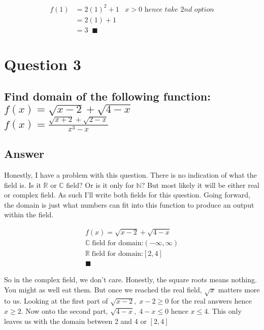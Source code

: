 \documentclass[17 pt]{extarticle}
\begin{document}
        \begin{equation*}
            \begin{split}
                f(1) &= 2(1)^2 + 1 \; \; \; \textit{$x > 0$ hence take 2nd option} \\
                &= 2(1) + 1 \\
                &= 3 \; \; \blacksquare
            \end{split}
            \end{equation*}
\section{Question 3}

\subsection*{Find domain of the following function: \newline \\ $f(x) =\sqrt{x-2} + \sqrt{4-x}$
\newline \\ $f(x) = \frac{\sqrt{x+2} + \sqrt{2-x}}{x^3-x}$}

\vspace{10mm}
\subsection*{Answer}

Honestly, I have a problem with this question. There is no indication of what the field is. Is it $\mathbb{R}$ or $\mathbb{C}$ field? Or is it only for $\mathbb{N}$? But most likely it will be either real or complex field. As 
such I'll write both fields for this question. Going forward, the domain is just what numbers can fit into this function to produce an output within the field.

\begin{equation*}
    \begin{split}
        f(x) =\sqrt{x-2} + \sqrt{4-x} \\
        \mathbb{C} \; \text{field for domain:} (- \infty, \infty) \\
        \mathbb{R} \; \text{field for domain:} [2,4] \\
         \blacksquare
    \end{split}
    \end{equation*}

So in the complex field, we don't care. Honestly, the square roots means nothing. You might as well eat them. But once we reached the 
real field, $\sqrt{x}$ matters more to us. Looking at the first part of $\sqrt{x-2}, \; x-2 \geq 0$ for the real answers hence $x \geq 2$. Now onto the second part, $\sqrt{4-x}, \;
4-x \leq 0$ hence $x \leq 4$. This only leaves us with the domain between 2 and 4 or $ [2,4] $
\end{document}
